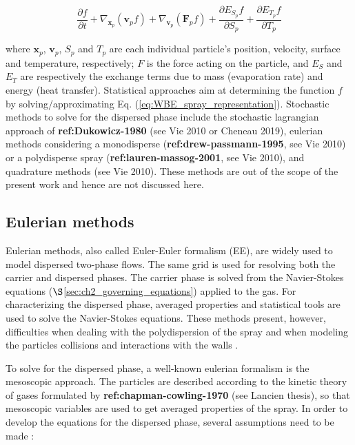 \begin{equation}
\label{eq:WBE_spray_representation}
\frac{\partial f}{\partial t} + \nabla_{\textbf{x}_p} \left( \textbf{v}_p f \right) + \nabla_{\textbf{v}_p} \left( \textbf{F}_p f \right) + \frac{\partial E_{S_p} f}{\partial S_p} + \frac{\partial E_{T_p} f}{\partial T_p}
\end{equation}

where $\textbf{x}_p$, $\textbf{v}_p$, $S_p$ and $T_p$ are each individual particle's position, velocity, surface and temperature, respectively; $F$ is the force acting on the particle, and $E_S$ and $E_T$ are respectively the exchange terms due to mass (evaporation rate) and energy (heat transfer). Statistical approaches aim at determining the function $f$ by solving/approximating Eq. (\ref{eq:WBE_spray_representation}). Stochastic methods to solve for the dispersed phase include the stochastic lagrangian approach of \textbf{ref:Dukowicz-1980} (see Vie 2010 or Cheneau 2019), eulerian methods considering a monodisperse (\textbf{ref:drew-passmann-1995}, see Vie 2010) or a polydisperse spray (\textbf{ref:lauren-massog-2001}, see Vie 2010), and quadrature methods (see Vie 2010). These methods are out of the scope of the present work and hence are not discussed here.



\subsection{Eulerian methods}

Eulerian methods, also called Euler-Euler formalism (EE), are widely used to model dispersed two-phase flows. The same grid is used for resolving both the carrier and dispersed phases. The carrier phase is solved from the Navier-Stokes equations ($\S$\ref{sec:ch2_governing_equations}) applied to the gas. For characterizing the dispersed phase, averaged properties and statistical tools are used to solve the Navier-Stokes equations. These methods present, however, difficulties when dealing with the polydispersion of the spray and when modeling the particles collisions and interactions with the walls .

To solve for the dispersed phase, a well-known eulerian formalism is the mesoscopic approach. The particles are described according to the kinetic theory of gases formulated by \textbf{ref:chapman-cowling-1970} (see Lancien thesis), so that mesoscopic variables are used to get averaged properties of the spray. In order to develop the equations for the dispersed phase, several assumptions need to be made :

